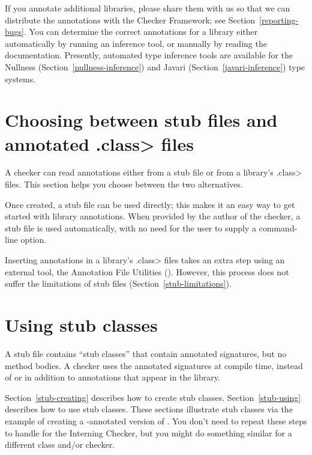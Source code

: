 If you annotate additional libraries, please share them with us so that we
can distribute the annotations with the Checker Framework; see
Section~\ref{reporting-bugs}.
You can determine the correct annotations for a library either
automatically by running an inference tool, or manually by reading the
documentation.  Presently, automated type inference tools are available for the
Nullness (Section~\ref{nullness-inference}) and Javari
(Section~\ref{javari-inference}) type systems.


\section{Choosing between stub files and annotated \<.class> files\label{stub-vs-class-files}}

A checker can read annotations either from a stub file or from a library's
\<.class> files.  This section helps you choose between the two alternatives.

Once created, a stub file can be used directly; this makes it an easy way
to get started with library annotations.
When provided by the author of the checker, a stub file is used
automatically, with no need for the user to supply a command-line option.

Inserting annotations in a library's \<.class> files takes an extra step
using an external tool, the Annotation File Utilities
().
However, this process does not suffer the limitations of stub files
(Section~\ref{stub-limitations}).


\section{Using stub classes\label{stub}\label{stub-creating-and-using}}

A stub file contains ``stub classes'' that contain annotated signatures,
but no method bodies.  A
checker uses the annotated signatures at compile time, instead of or in
addition to annotations that appear in the library.

Section~\ref{stub-creating} describes how to create stub classes.
Section~\ref{stub-using} describes how to use stub classes.
These sections illustrate stub classes via the example of creating a -annotated
version of .  You don't need to repeat these steps
to handle  for the Interning Checker,
but you might do something similar for a different class and/or checker.

